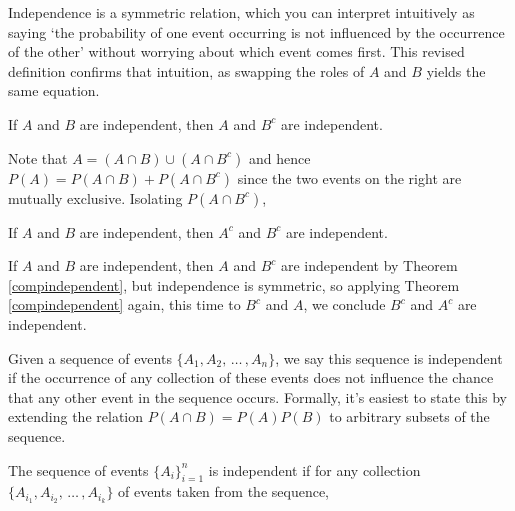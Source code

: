 \rmk Independence is a symmetric relation, which you can interpret intuitively as saying `the probability of one event occurring is not influenced by the occurrence of the other' without worrying about which event comes first. This revised definition confirms that intuition, as swapping the roles of $A$ and $B$ yields the same equation.
\begin{thm}\label{compindependent}
If $A$ and $B$ are independent, then $A$ and $B^c$ are independent.
\end{thm}
\begin{pf}
Note that $A = (A \cap B) \cup (A \cap B^c)$ and hence $P(A) = P(A \cap B) + P(A \cap B^c)$ since the two events on the right are mutually exclusive. Isolating $P(A \cap B^c)$,
\end{pf}
\begin{cor}
If $A$ and $B$ are independent, then $A^c$ and $B^c$ are independent.
\end{cor}
\begin{pf}
If $A$ and $B$ are independent, then $A$ and $B^c$ are independent by Theorem \ref{compindependent}, but independence is symmetric, so applying Theorem \ref{compindependent} again, this time to $B^c$ and $A$, we conclude $B^c$ and $A^c$ are independent.
\end{pf}
\par
Given a sequence of events $\{A_1, A_2, \, \dots \, , A_n\}$, we say this sequence is independent if the occurrence of any collection of these events does not influence the chance that any other event in the sequence occurs. Formally, it's easiest to state this by extending the relation $P(A \cap B) = P(A)P(B)$ to arbitrary subsets of the sequence.
\begin{defn}
The sequence of events $\{A_i\}_{i=1}^{n}$ is independent if for any collection $\{A_{i_1}, A_{i_2}, \, \dots \, , A_{i_k}\}$ of events taken from the sequence,
\end{defn}
